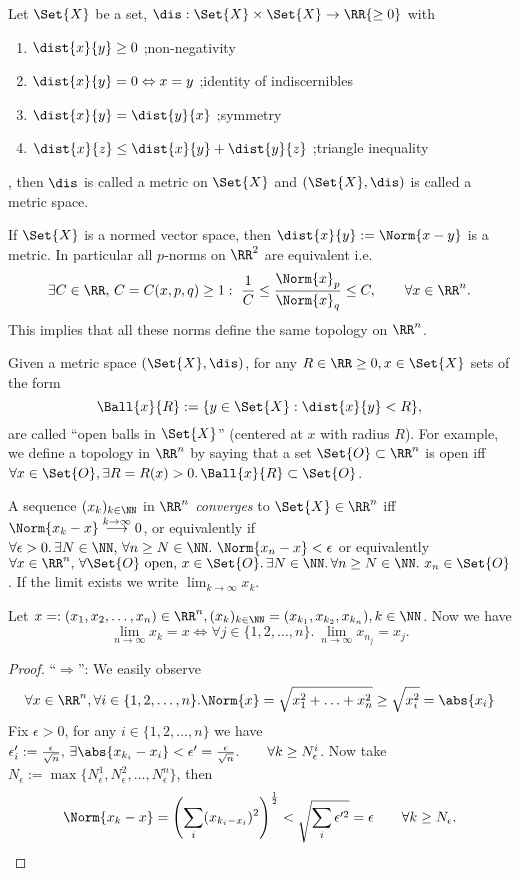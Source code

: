 \begin{defn}
 Let $\Set{X}$ be a set, $\dis:\Set{X}\times\Set{X}\to\RR{\geq 0}$ with 
 \begin{enumerate}
 \item $\dist{x}{y} \geq 0$ \qquad ;non-negativity
  \item $\dist{x}{y}=0\Leftrightarrow x=y$ \qquad ;identity of indiscernibles
  \item $\dist{x}{y}=\dist{y}{x}$ \qquad ;symmetry
  \item $\dist{x}{z}\leq \dist{x}{y}+\dist{y}{z}$ \qquad ;triangle inequality
 \end{enumerate}, then $\dis$ is called a metric on $\Set{X}$ and $(\Set{X}, \dis)$ is called a metric space.
\end{defn}
\begin{exc}
 If $\Set{X}$ is a normed vector space, then $\dist{x}{y}:=\Norm{x-y}$ is a metric. 
 In particular all $p$-norms on $\RR^2$ are equivalent i.e.
 $$\exists C\in\RR,\,C=C(x,p,q)\geq 1:\ \frac{1}{C}\leq\frac{\Norm{x}_p}{\Norm{x}_q}\leq C, \qquad\forall x\in\RR^n.$$
 This implies that all these norms define the same topology on $\RR^n$. 
\end{exc}
\begin{rem}
  Given a metric space $(\Set{X}, \dis)$, for any $R \in \RR \geq 0,x\in\Set{X}$ sets of the form
  $$\Ball{x}{R}:=\{y\in\Set{X}:  \dist{x}{y}<R\},$$
  are called ``open balls in $\Set{X}$'' (centered at $x$ with radius $R$). For example, we define a topology in $\RR^n$ by saying that a set $\Set{O}\subset\RR^n$ is open iff $\forall x\in\Set{O}, \exists R=R(x)>0. \,\Ball{x}{R}\subset\Set{O}$.
\end{rem}
\begin{defn}[limits]
 A sequence $(x_k)_{k\in\NN}$ in $\RR^n$ \emph{converges} to $\Set{X}\in\RR^n$ iff $\Norm{x_k-x}\overset{k\to\infty}{\longrightarrow}0$, or equivalently if $\forall \epsilon>0.\,\exists N\in\NN, \,\forall n\geq N\in\NN.\ \Norm{x_n-x}<\epsilon$ or equivalently $\forall x\in\RR^n,\,\forall \Set{O}\text{ open},\,x\in\Set{O}.\,\exists N\in\NN.\,\forall n\geq N\in\NN.\ x_n\in\Set{O}$. If the limit exists we write $\lim_{k\to\infty}x_k$.
\end{defn}
\begin{lem}
 \label{lem:comp}
 Let $x=:(x_1, x_2,\ldots,x_n)\in\RR^n, (x_k)_{k\in\NN}=(x_{k_1},x_{k_2}, x_{k_n}), k\in\NN$.
 Now we have $$\lim_{n\to\infty}x_k=x\Leftrightarrow \forall j\in \{1,2,\ldots,n\}.\ \lim_{n\to\infty}x_{n_j}=x_j.$$
\end{lem}
\begin{proof}
 ``$\Rightarrow$'': We easily observe $$\forall x\in\RR^n, \forall i\in\{1, 2, \ldots,n\}. \Norm{x}=\sqrt{x_1^2+\ldots+x_n^2}\geq \sqrt{x_i ^2}=\abs{x_i}$$
 Fix $\epsilon>0$, for any $i\in\{1, 2, \ldots, n\}$ we have $\epsilon_i':=\frac{\epsilon}{\sqrt{n}},\,\exists\abs{x_{k_i}-x_i}<\epsilon'=\frac{\epsilon}{\sqrt{n}}.\qquad\forall k\geq N_{\epsilon}^i$. Now take $N_\epsilon:=\max\{N_{\epsilon}^1, N_{\epsilon}^2, \ldots, N_{\epsilon}^n\}$, then $$\Norm{x_k-x}=\left(\sum_i(x_{k_i-x_i})^2\right)^{\frac{1}{2}}<\sqrt{\sum_i \epsilon'^2}=\epsilon\qquad\forall k\geq N_\epsilon.$$
\end{proof}

